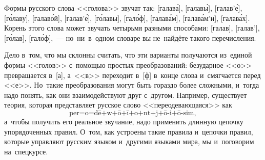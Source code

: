 



Формы русского слова <<голова>> звучат так:
[галава́], [галавы́], [галав’е́], [го́лаву], [галаво́й], [галав’е́],
[го́лавы], [гало́ф], [галава́м], [галава́м'и], [галава́х].
Корень этого слова может звучать четырьмя разными способами:
[галав], [галав’], [го́лав], [гало́ф],~---
но~ни~в~одном словаре вы не~найдёте такого перечисления.

Дело в~том, что мы склонны считать, что эти варианты получаются из~единой формы
<<голов>> с~помощью простых преобразований:
безударное <<о>> превращается в~[а], а~<<в>> переходит в~[ф] в~конце слова
и~смягчается перед <<е>>.
Но~такие преобразования могут быть гораздо более сложными, и~тогда надо понять,
как они взаимодействуют друг с~другом.
Например, существует теория, которая представляет русское слово
<<переодевающаяся>> как
\[ \text{per=o=dē+w+ō+ī+o+nt+j+ō-i+ō-sim}, \]
а~чтобы получить его реальное звучание, надо применить длинную цепочку
упорядоченных правил.
О~том, как устроены такие правила и~цепочки правил, которые управляют русским
языком и~другими языками мира, мы и~поговорим на~спецкурсе.


